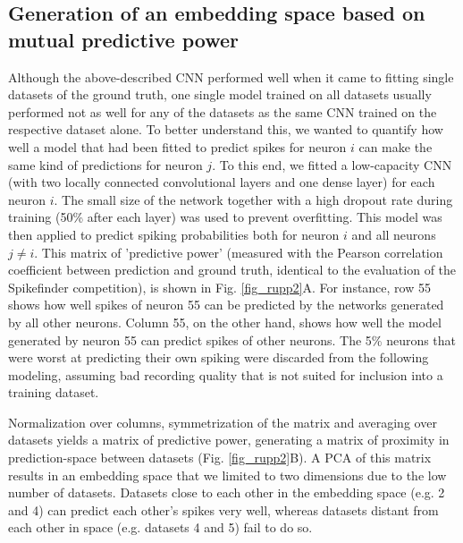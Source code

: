\documentclass[10pt,letterpaper]{article}
\begin{document}
\subsection*{Generation of an embedding space based on mutual predictive power}

Although the above-described CNN performed well when it came to fitting single datasets of the ground truth, one single model trained on all datasets usually performed not as well for any of the datasets as the same CNN trained on the respective dataset alone. To better understand this, we wanted to quantify how well a model that had been fitted to predict spikes for neuron $i$ can make the same kind of predictions for neuron $j$. To this end, we fitted a low-capacity CNN (with two locally connected convolutional layers and one dense layer) for each neuron $i$. The small size of the network together with a high dropout rate during training (50\% after each layer) was used to prevent overfitting. This model was then applied to predict spiking probabilities both for neuron $i$ and all neurons $j \neq i$. This matrix of 'predictive power' (measured with the Pearson correlation coefficient between prediction and ground truth, identical to the evaluation of the Spikefinder competition), is shown in Fig. \ref{fig_rupp2}A. For instance, row 55 shows how well spikes of neuron 55 can be predicted by the networks generated by all other neurons. Column 55, on the other hand, shows how well the model generated by neuron 55 can predict spikes of other neurons. The 5\% neurons that were worst at predicting their own spiking were discarded from the following modeling, assuming bad recording quality that is not suited for inclusion into a training dataset.

Normalization over columns, symmetrization of the matrix and averaging over datasets yields a matrix of predictive power, generating a matrix of proximity in prediction-space between datasets (Fig. \ref{fig_rupp2}B). A PCA of this matrix results in an embedding space that we limited to two dimensions due to the low number of datasets. Datasets close to each other in the embedding space (e.g. 2 and 4) can predict each other's spikes very well, whereas datasets distant from each other in space (e.g. datasets 4 and 5) fail to do so.
\end{document}
